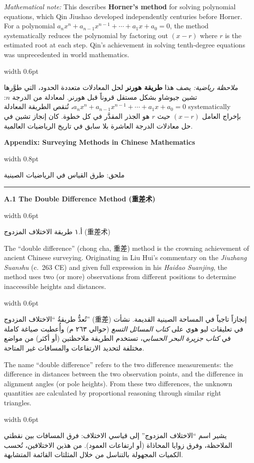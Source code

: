\documentclass[11pt,a4paper]{article}
\newlength{\cnwidth}
\newlength{\arwidth}
\newcommand{\paralleltext}[2]{%
  \par\medskip\noindent
  \begin{minipage}[t]{\cnwidth}%
    \small #1%
  \end{minipage}%
  \hfill\textcolor{colrule}{\vrule width 0.6pt}\hfill
  \begin{minipage}[t]{\arwidth}%
    \small\arabicfont\beginR #2\endR%
  \end{minipage}%
  \par\medskip
}
\newcommand{\parallelsection}[2]{%
  \par\bigskip\noindent
  \begin{minipage}[t]{\cnwidth}%
    \Large\bfseries\color{sectioncolor} #1%
  \end{minipage}%
  \hfill\textcolor{colrule}{\vrule width 0.8pt}\hfill
  \begin{minipage}[t]{\arwidth}%
    \Large\arabicfontbf\color{sectioncolor}\beginR #2\endR%
  \end{minipage}%
  \par\medskip\noindent\textcolor{colrule}{\rule{\textwidth}{0.6pt}}\par\medskip
}
\newcommand{\parallelsubsection}[2]{%
  \par\medskip\noindent
  \begin{minipage}[t]{\cnwidth}%
    \large\bfseries\color{sectioncolor} #1%
  \end{minipage}%
  \hfill\textcolor{colrule}{\vrule width 0.6pt}\hfill
  \begin{minipage}[t]{\arwidth}%
    \large\arabicfontbf\color{sectioncolor}\beginR #2\endR%
  \end{minipage}%
  \par\smallskip
}
\begin{document}
\paralleltext{%
\textit{Mathematical note:} This describes \textbf{Horner's method} for solving polynomial equations, which Qin Jiushao developed independently centuries before Horner. For a polynomial $a_n x^n + a_{n-1} x^{n-1} + \cdots + a_1 x + a_0 = 0$, the method systematically reduces the polynomial by factoring out $(x - r)$ where $r$ is the estimated root at each step. Qin's achievement in solving tenth-degree equations was unprecedented in world mathematics.
}{%
\textit{ملاحظة رياضية:} يصف هذا \textbf{طريقة هورنر} لحل المعادلات متعددة الحدود، التي طوَّرها تشين جيوشاو بشكل مستقل قروناً قبل هورنر. لمعادلة من الدرجة $n$: $a_n x^n + a_{n-1} x^{n-1} + \cdots + a_1 x + a_0 = 0$، تُنقص الطريقة المعادلة systematically بإخراج العامل $(x - r)$ حيث $r$ هو الجذر المقدَّر في كل خطوة. كان إنجاز تشين في حل معادلات الدرجة العاشرة بلا سابق في تاريخ الرياضيات العالمية.
}

\newpage

\parallelsection{Appendix: Surveying Methods in Chinese Mathematics}{ملحق: طرق القياس في الرياضيات الصينية}

\parallelsubsection{A.1 The Double Difference Method (重差术)}{أ.١ طريقة الاختلاف المزدوج (重差术)}

\paralleltext{%
The ``double difference'' (chong cha, 重差) method is the crowning achievement of ancient Chinese surveying. Originating in Liu Hui's commentary on the \textit{Jiuzhang Suanshu} (c.\ 263 CE) and given full expression in his \textit{Haidao Suanjing}, the method uses two (or more) observations from different positions to determine inaccessible heights and distances.
}{%
تُعدُّ طريقةُ ``الاختلاف المزدوج'' (重差) إنجازاً تاجياً في المساحة الصينية القديمة. نشأت في تعليقات ليو هوي على \textit{كتاب المسائل التسع} (حوالي ٢٦٣ م) وأُعطيت صياغة كاملة في \textit{كتاب جزيرة البحر الحسابي}، تستخدم الطريقة ملاحظتين (أو أكثر) من مواضع مختلفة لتحديد الارتفاعات والمسافات غير المتاحة.
}

\paralleltext{%
The name ``double difference'' refers to the two difference measurements: the difference in distances between the two observation points, and the difference in alignment angles (or pole heights). From these two differences, the unknown quantities are calculated by proportional reasoning through similar right triangles.
}{%
يشير اسم ``الاختلاف المزدوج'' إلى قياسي الاختلاف: فرق المسافات بين نقطتي الملاحظة، وفرق زوايا المحاذاة (أو ارتفاعات العمود). من هذين الاختلافين، تُحسب الكميات المجهولة بالتناسل من خلال المثلثات القائمة المتشابهة.
}
\end{document}
